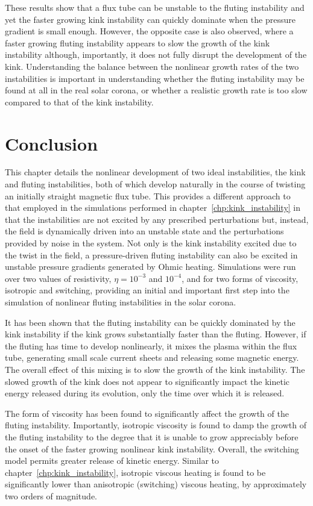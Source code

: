 These results show that a flux tube can be unstable to the fluting instability and yet the faster growing kink instability can quickly dominate when the pressure gradient is small enough. However, the opposite case is also observed, where a faster growing fluting instability appears to slow the growth of the kink instability although, importantly, it does not fully disrupt the development of the kink. Understanding the balance between the nonlinear growth rates of the two instabilities is important in understanding whether the fluting instability may be found at all in the real solar corona, or whether a realistic growth rate is too slow compared to that of the kink instability.

\section{Conclusion}

This chapter details the nonlinear development of two ideal instabilities, the kink and fluting instabilities, both of which develop naturally in the course of twisting an initially straight magnetic flux tube. This provides a different approach to that employed in the simulations performed in chapter~\ref{chp:kink_instability} in that the instabilities are not excited by any prescribed perturbations but, instead, the field is dynamically driven into an unstable state and the perturbations provided by noise in the system. Not only is the kink instability excited due to the twist in the field, a pressure-driven fluting instability can also be excited in unstable pressure gradients generated by Ohmic heating. Simulations were run over two values of resistivity, $\eta=10^{-3}$ and $10^{-4}$, and for two forms of viscosity, isotropic and switching, providing an initial and important first step into the simulation of nonlinear fluting instabilities in the solar corona.

It has been shown that the fluting instability can be quickly dominated by the kink instability if the kink grows substantially faster than the fluting. However, if the fluting has time to develop nonlinearly, it mixes the plasma within the flux tube, generating small scale current sheets and releasing some magnetic energy. The overall effect of this mixing is to slow the growth of the kink instability. The slowed growth of the kink does not appear to significantly impact the kinetic energy released during its evolution, only the time over which it is released. 

The form of viscosity has been found to significantly affect the growth of the fluting instability. Importantly, isotropic viscosity is found to damp the growth of the fluting instability to the degree that it is unable to grow appreciably before the onset of the faster growing nonlinear kink instability. Overall, the switching model permits greater release of kinetic energy. Similar to chapter~\ref{chp:kink_instability}, isotropic viscous heating is found to be significantly lower than anisotropic (switching) viscous heating, by approximately two orders of magnitude.

